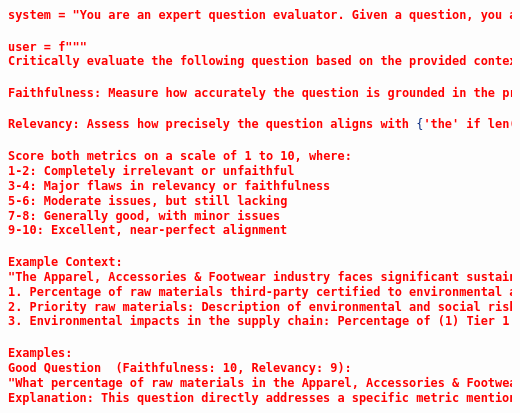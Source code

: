 \begin{lstlisting}[language=JSON,firstnumber=1,label={lst:fewshot_prompt},caption={Prompt for question faithfulness/relevance evaluation}]
system = "You are an expert question evaluator. Given a question, you assess its faithfulness and relevance relative to the reference text.

user = f"""
Critically evaluate the following question based on the provided context for the relevant {'industry' if len(industries) == 1 else 'industries'}. Be extremely rigorous and unforgiving in your assessment.

Faithfulness: Measure how accurately the question is grounded in the provided context{'s' if len(industries) > 1 else ''}. A faithful question must be directly answerable from the given information without any need for external knowledge or inference. Be extremely critical - even minor discrepancies or omissions should significantly impact the score.

Relevancy: Assess how precisely the question aligns with {'the' if len(industries) == 1 else 'each'} industry's specific context, challenges, and goals. A highly relevant question should directly address key aspects, metrics, or challenges unique to the industry. Be very strict - even slight deviations from industry-specific concerns should result in lower scores. ALSO: if the question does not cover all the industries required, it must be considered irrelevant and given a score of 1.

Score both metrics on a scale of 1 to 10, where:
1-2: Completely irrelevant or unfaithful
3-4: Major flaws in relevancy or faithfulness
5-6: Moderate issues, but still lacking
7-8: Generally good, with minor issues
9-10: Excellent, near-perfect alignment

Example Context:
"The Apparel, Accessories & Footwear industry faces significant sustainability challenges, particularly in raw materials sourcing. Key metrics include:
1. Percentage of raw materials third-party certified to environmental and/or social sustainability standards.
2. Priority raw materials: Description of environmental and social risks and/or hazards associated with priority raw materials used for products.
3. Environmental impacts in the supply chain: Percentage of (1) Tier 1 supplier facilities and (2) supplier facilities beyond Tier 1 that have completed the Sustainable Apparel Coalition's Higg Facility Environmental Module (Higg FEM) assessment or an equivalent environmental data assessment."

Examples:
Good Question  (Faithfulness: 10, Relevancy: 9):
"What percentage of raw materials in the Apparel, Accessories & Footwear industry should be third-party certified to environmental or social sustainability standards, according to the context?"
Explanation: This question directly addresses a specific metric mentioned in the industry context and can be answered solely based on the provided information.


\end{lstlisting}
